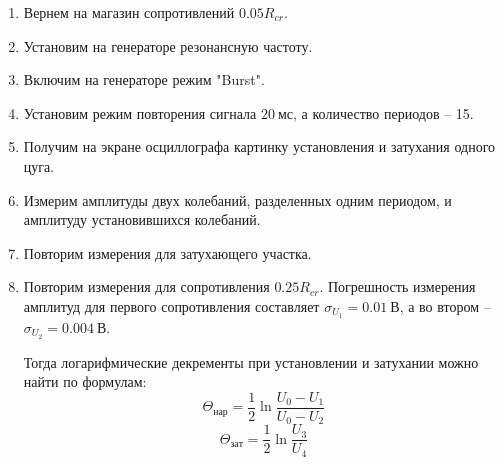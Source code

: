 \documentclass[14pt, a4paper]{report}
\begin{document}
\begin{enumerate}

\setcounter{enumi}{0}

\item Вернем на магазин сопротивлений $0.05R_{cr}$.

\item Установим на генераторе резонансную частоту.

\item Включим на генераторе режим "Burst".

\item Установим режим повторения сигнала $20\ мс$, а количество периодов -- 15.

\item Получим на экране осциллографа картинку установления и затухания одного цуга.

\item Измерим амплитуды двух колебаний, разделенных одним периодом, и амплитуду установившихся колебаний.

\item Повторим измерения для затухающего участка.

\item Повторим измерения для сопротивления $0.25R_{cr}$. Погрешность измерения амплитуд для первого сопротивления составляет $\sigma_{U_1}=0.01\ В$, а во втором -- $\sigma_{U_2}=0.004\ В$.

\begin{table}[H]
\centering
{}
\caption{Результаты измерения амплитуды затухающих колебаний}
\end{table}

Тогда логарифмические декременты при установлении и затухании можно найти по формулам:
\[\Theta_{нар}=\frac{1}{2}\ln{\frac{U_0-U_1}{U_0-U_2}}\]
\[\Theta_{зат}=\frac{1}{2}\ln{\frac{U_3}{U_4}}\]

\begin{table}[H]
\centering
{}
\caption{Вычисление добротности по амплитудам затухающих колебаний}
\end{table}



\end{enumerate}
\end{document}
